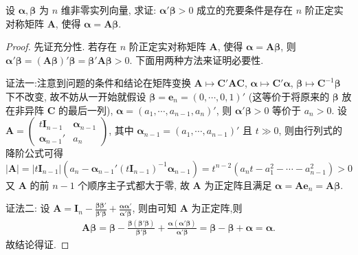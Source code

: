 \documentclass[../../main.tex]{subfiles}%
\begin{document}
\begin{proposition}
设 \(\boldsymbol{\alpha},\boldsymbol{\beta}\) 为 \(n\) 维非零实列向量, 求证: \(\boldsymbol{\alpha}'\boldsymbol{\beta}>0\) 成立的充要条件是存在 \(n\) 阶正定实对称矩阵 \(\boldsymbol{A}\), 使得 \(\boldsymbol{\alpha}=\boldsymbol{A}\boldsymbol{\beta}\).
\end{proposition}
\begin{proof}
先证充分性. 若存在 \(n\) 阶正定实对称矩阵 \(\boldsymbol{A}\), 使得 \(\boldsymbol{\alpha}=\boldsymbol{A}\boldsymbol{\beta}\), 则 \(\boldsymbol{\alpha}'\boldsymbol{\beta}=(\boldsymbol{A}\boldsymbol{\beta})'\boldsymbol{\beta}=\boldsymbol{\beta}'\boldsymbol{A}\boldsymbol{\beta}>0\). 下面用两种方法来证明必要性.

{\color{blue}证法一:}注意到问题的条件和结论在矩阵变换 \(\boldsymbol{A}\mapsto\boldsymbol{C}'\boldsymbol{A}\boldsymbol{C}\), \(\boldsymbol{\alpha}\mapsto\boldsymbol{C}'\boldsymbol{\alpha}\), \(\boldsymbol{\beta}\mapsto\boldsymbol{C}^{-1}\boldsymbol{\beta}\) 下不改变, 故不妨从一开始就假设 \(\boldsymbol{\beta}=\boldsymbol{e}_n=(0,\cdots,0,1)'\) (这等价于将原来的 \(\boldsymbol{\beta}\) 放在非异阵 \(\boldsymbol{C}\) 的最后一列), \(\boldsymbol{\alpha}=(a_1,\cdots,a_{n - 1},a_n)'\), 则 \(\boldsymbol{\alpha}'\boldsymbol{\beta}>0\) 等价于 \(a_n>0\). 设 \(\boldsymbol{A}=\begin{pmatrix}t\boldsymbol{I}_{n - 1}&\boldsymbol{\alpha}_{n - 1}\\\boldsymbol{\alpha}_{n - 1}'&a_n\end{pmatrix}\), 其中 \(\boldsymbol{\alpha}_{n - 1}=(a_1,\cdots,a_{n - 1})'\) 且 \(t\gg0\), 则由行列式的降阶公式可得
\[|\boldsymbol{A}|=|t\boldsymbol{I}_{n - 1}|(a_n-\boldsymbol{\alpha}_{n - 1}'(t\boldsymbol{I}_{n - 1})^{-1}\boldsymbol{\alpha}_{n - 1})=t^{n - 2}(a_nt - a_1^2-\cdots - a_{n - 1}^2)>0\]
又 \(\boldsymbol{A}\) 的前 \(n - 1\) 个顺序主子式都大于零, 故 \(\boldsymbol{A}\) 为正定阵且满足 \(\boldsymbol{\alpha}=\boldsymbol{A}\boldsymbol{e}_n=\boldsymbol{A}\boldsymbol{\beta}\).

{\color{blue}证法二:} 设 \(\boldsymbol{A}=\boldsymbol{I}_n-\frac{\boldsymbol{\beta}\boldsymbol{\beta}'}{\boldsymbol{\beta}'\boldsymbol{\beta}}+\frac{\boldsymbol{\alpha}\boldsymbol{\alpha}'}{\boldsymbol{\alpha}'\boldsymbol{\beta}}\), 则由可知 \(\boldsymbol{A}\) 为正定阵,则
\begin{align*}
\boldsymbol{A\beta }=\boldsymbol{\beta }-\frac{\boldsymbol{\beta }\left( \boldsymbol{\beta }' \boldsymbol{\beta } \right)}{\boldsymbol{\beta }' \boldsymbol{\beta }}+\frac{\boldsymbol{\alpha }\left( \boldsymbol{\alpha }' \boldsymbol{\beta } \right)}{\boldsymbol{\alpha }'\boldsymbol{\beta }}=\boldsymbol{\beta }-\boldsymbol{\beta }+\boldsymbol{\alpha }=\boldsymbol{\alpha }.
\end{align*}
故结论得证.
\end{proof}
\end{document}
